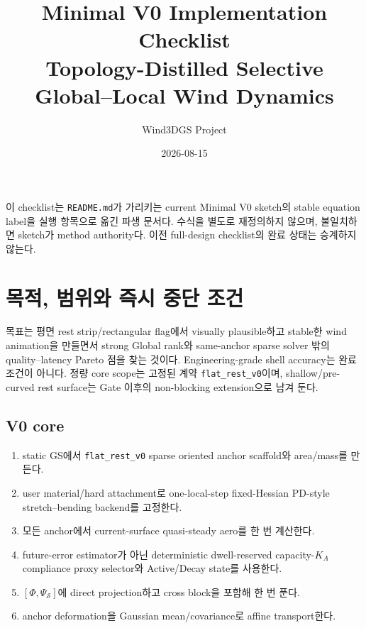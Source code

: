 \documentclass[10pt]{article}
\title{\textbf{Minimal V0 Implementation Checklist}\\
Topology-Distilled Selective Global--Local Wind Dynamics}
\author{Wind3DGS Project}
\date{2026-08-15}
\newcommand{\code}[1]{{\small\nolinkurl{#1}}}
\begin{document}
\maketitle

\begin{tcolorbox}[colback=CoreLight,colframe=CoreBlue,title=Authority contract,fonttitle=\bfseries]
이 checklist는 \code{README.md}가 가리키는 current Minimal V0 sketch의
stable equation label을 실행 항목으로 옮긴 파생 문서다.
수식을 별도로 재정의하지 않으며, 불일치하면 sketch가 method authority다.
이전 full-design checklist의 완료 상태는 승계하지 않는다.
\end{tcolorbox}

\tableofcontents
\newpage

\section{목적, 범위와 즉시 중단 조건}

목표는 평면 rest strip/rectangular flag에서 visually plausible하고 stable한 wind animation을 만들면서
strong Global rank와 same-anchor sparse solver 밖의 quality--latency Pareto 점을 찾는 것이다.
Engineering-grade shell accuracy는 완료 조건이 아니다.
정량 core scope는 고정된 계약 \code{flat\_rest\_v0}이며,
shallow/pre-curved rest surface는 Gate 이후의 non-blocking extension으로 남겨 둔다.

\subsection{V0 core}

\begin{enumerate}
  \item static GS에서 \code{flat\_rest\_v0} sparse oriented anchor scaffold와
  area/mass를 만든다.
  \item user material/hard attachment로 one-local-step fixed-Hessian PD-style
  stretch--bending backend를 고정한다.
  \item 모든 anchor에서 current-surface quasi-steady aero를 한 번 계산한다.
  \item future-error estimator가 아닌 deterministic dwell-reserved capacity-\(K_A\)
  compliance proxy selector와
  Active/Decay state를 사용한다.
  \item \([\Phi,\Psi_{\mathcal S}]\)에 direct projection하고 cross block을 포함해 한 번 푼다.
  \item anchor deformation을 Gaussian mean/covariance로 affine transport한다.
\end{enumerate}
\end{document}

